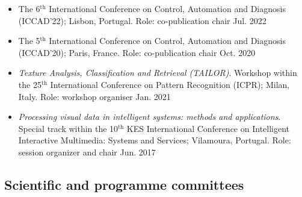 \documentclass[11pt]{article}
\begin{document}
\begin{itemize} 

	\item The 6$^\text{th}$ International Conference on Control, Automation and Diagnosis (ICCAD'22); Lisbon, Portugal. Role: co-publication chair \hfill Jul. 2022

	\item The 5$^\text{th}$ International Conference on Control, Automation and Diagnosis (ICCAD'20); Paris, France. Role: co-publication chair \hfill Oct. 2020 

	\item \emph{Texture Analysis, Classification and Retrieval (TAILOR)}. Workshop within the 25$^\text{th}$ International Conference on Pattern Recognition (ICPR); Milan, Italy. Role: workshop organiser \hfill Jan. 2021

	\item \emph{Processing visual data in intelligent systems: methods and applications}. Special track within the 10$^\text{th}$ KES International Conference on Intelligent Interactive Multimedia: Systems and Services; Vilamoura, Portugal. Role: session organizer and chair \hfill Jun. 2017

\end{itemize}	

\subsection*{Scientific and programme committees}
\end{document}
